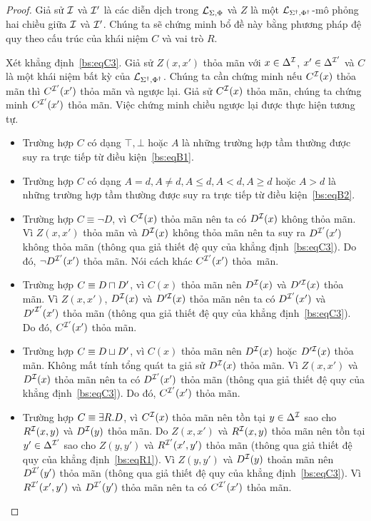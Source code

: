 \begin{proof}
	Giả sử $\mathcal{I}$ và $\mathcal{I}'$ là các diễn dịch trong $\mathcal{L}_{\Sigma,\Phi}$ và $Z$ là một $\mathcal{L}_{\Sigma^\dag,\Phi^\dag}$-mô phỏng hai chiều giữa $\mathcal{I}$ và $\mathcal{I}'$. Chúng ta sẽ chứng minh bổ đề này bằng phương pháp đệ quy theo cấu trúc của khái niệm $C$ và vai trò $R$.
	
	\semiItem Xét khẳng định~\eqref{bs:eqC3}. Giả sử $Z(x,x')$ thỏa mãn với $x \in \Delta^{\mathcal{I}}$, $x' \in \Delta^{\mathcal{I}'}$ và $C$ là một khái niệm bất kỳ của $\mathcal{L}_{\Sigma^\dag,\Phi^\dag}$. Chúng ta cần chứng minh nếu $C^{\mathcal{I}}(x)$ thỏa mãn thì $C^{\mathcal{I}'}(x')$ thỏa mãn và ngược lại.
	Giả sử $C^{\mathcal{I}}(x)$ thỏa mãn, chúng ta chứng minh $C^{\mathcal{I}'}(x')$ thỏa mãn. Việc chứng minh chiều ngược lại được thực hiện tương tự.
	
	\begin{itemize}
		\item Trường hợp $C$ có dạng $\top, \bot$ hoặc $A$ là những trường hợp tầm thường được suy ra trực tiếp từ điều kiện~\eqref{bs:eqB1}.
		
		\item Trường hợp $C$ có dạng $A = d, A\not=d, A \leq d, A < d, A \geq d$ hoặc $A > d$ là những trường hợp tầm thường được suy ra trực tiếp từ điều kiện~\eqref{bs:eqB2}.
		
		\item Trường hợp $C \equiv \neg D$, vì $C^{\mathcal{I}}(x)$ thỏa mãn nên ta có $D^{\mathcal{I}}(x)$ không thỏa mãn. Vì $Z(x,x')$ thỏa mãn và $D^{\mathcal{I}}(x)$ không thỏa mãn nên ta suy ra $D^{\mathcal{I}'}(x')$ không thỏa mãn (thông qua giả thiết đệ quy của khẳng định~\eqref{bs:eqC3}). Do đó, $\neg D^{\mathcal{I}'}(x')$ thỏa mãn. Nói cách khác $C^{\mathcal{I}'}(x')$ thỏa~mãn.
		
		\item Trường hợp $C \equiv D \sqcap D'$, vì $C(x)$ thỏa mãn nên $D^{\mathcal{I}}(x)$ và $D'^{\mathcal{I}}(x)$ thỏa mãn. Vì $Z(x, x')$,  $D^{\mathcal{I}}(x)$ và $D'^{\mathcal{I}}(x)$ thỏa mãn nên ta có $D^{\mathcal{I}'}(x')$ và ${D'}^{\mathcal{I}'}(x')$ thỏa mãn (thông qua giả thiết đệ quy của khẳng định~\eqref{bs:eqC3}). Do đó, $C^{\mathcal{I}'}(x')$ thỏa mãn.
		
		\item Trường hợp $C \equiv D \sqcup D'$, vì $C(x)$ thỏa mãn nên $D^{\mathcal{I}}(x)$ hoặc $D'^{\mathcal{I}}(x)$ thỏa mãn. Không mất tính tổng quát ta giả sử $D^{\mathcal{I}}(x)$ thỏa mãn. Vì $Z(x, x')$ và $D^{\mathcal{I}}(x)$ thỏa mãn nên ta có $D^{\mathcal{I}'}(x')$ thỏa mãn (thông qua giả thiết đệ quy của khẳng định~\eqref{bs:eqC3}). Do đó, $C^{\mathcal{I}'}(x')$ thỏa mãn.
		
		\item Trường hợp $C \equiv \exists R.D$, vì $C^{\mathcal{I}}(x)$ thỏa mãn nên tồn tại $y \in \Delta^{\mathcal{I}}$ sao cho $R^{\mathcal{I}}(x, y)$ và $D^{\mathcal{I}}(y)$ thỏa mãn. Do $Z(x,x')$ và $R^{\mathcal{I}}(x, y)$ thỏa mãn nên tồn tại $y' \in \Delta^{\mathcal{I}'}$ sao cho $Z(y,y')$ và $R^{\mathcal{I}'}(x',y')$ thỏa mãn (thông qua giả thiết đệ quy của khẳng định~\eqref{bs:eqR1}). Vì $Z(y,y')$ và $D^{\mathcal{I}}(y)$ thoản mãn nên $D^{\mathcal{I}'}(y')$ thỏa mãn (thông qua giả thiết đệ quy của khẳng định~\eqref{bs:eqC3}). Vì $R^{\mathcal{I}'}(x',y')$ và $D^{\mathcal{I}'}(y')$ thỏa mãn nên ta có $C^{\mathcal{I}'}(x')$ thỏa mãn.
		

\end{itemize}
\end{proof}
